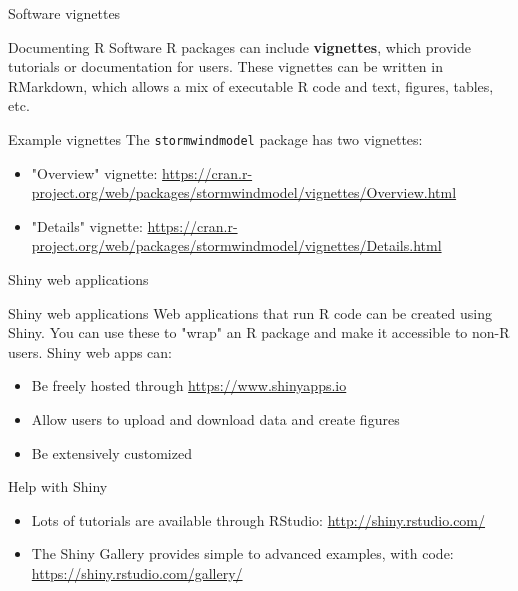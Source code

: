 \documentclass[ignorenonframetext,]{beamer}
\begin{document}
\begin{frame}{Software vignettes}

\begin{block}{Documenting R Software}
R packages can include \textbf{vignettes}, which provide tutorials or documentation for users. These vignettes can be written in RMarkdown, which allows a mix of executable R code and text, figures, tables, etc.
\end{block}

\begin{block}{Example vignettes}
The \texttt{stormwindmodel} package has two vignettes: 
\begin{itemize}
  \item "Overview" vignette: \url{https://cran.r-project.org/web/packages/stormwindmodel/vignettes/Overview.html}
  \item "Details" vignette: \url{https://cran.r-project.org/web/packages/stormwindmodel/vignettes/Details.html}
\end{itemize}
\end{block}

\end{frame}

\begin{frame}{Shiny web applications}

\begin{block}{Shiny web applications}
Web applications that run R code can be created using Shiny. You can use these to "wrap" an R package and make it accessible to non-R users. Shiny web apps can:
\begin{itemize}
  \item Be freely hosted through \url{https://www.shinyapps.io}
  \item Allow users to upload and download data and create figures
  \item Be extensively customized
\end{itemize}
\end{block}

\begin{block}{Help with Shiny}
\begin{itemize}
  \item Lots of tutorials are available through RStudio: \url{http://shiny.rstudio.com/}
  \item The Shiny Gallery provides simple to advanced examples, with code: \url{https://shiny.rstudio.com/gallery/}
\end{itemize}
\end{block}

\end{frame}
\end{document}
